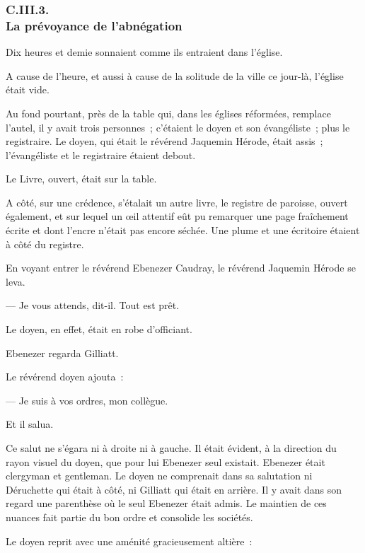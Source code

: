 \documentclass[french,twoside]{book} %
\begin{document}
 \subsubsection[{C.III.3. La prévoyance de l’abnégation}]{C.III.3. \\
La prévoyance de l’abnégation}
\noindent Dix heures et demie sonnaient comme ils entraient dans l’église.\par
A cause de l’heure, et aussi à cause de la solitude de la ville ce jour-là, l’église était vide.\par
Au fond pourtant, près de la table qui, dans les églises réformées, remplace l’autel, il y avait trois personnes ; c’étaient le doyen et son évangéliste ; plus le registraire. Le doyen, qui était le révérend Jaquemin Hérode, était assis ; l’évangéliste et le registraire étaient debout.\par
Le Livre, ouvert, était sur la table.\par
A côté, sur une crédence, s’étalait un autre livre, le registre de paroisse, ouvert également, et sur lequel un œil attentif eût pu remarquer une page fraîchement écrite et dont l’encre n’était pas encore séchée. Une plume et une écritoire étaient à côté du registre.\par
 En voyant entrer le révérend Ebenezer Caudray, le révérend Jaquemin Hérode se leva.\par
— Je vous attends, dit-il. Tout est prêt.\par
Le doyen, en effet, était en robe d’officiant.\par
Ebenezer regarda Gilliatt.\par
Le révérend doyen ajouta :\par
— Je suis à vos ordres, mon collègue.\par
Et il salua.\par
Ce salut ne s’égara ni à droite ni à gauche. Il était évident, à la direction du rayon visuel du doyen, que pour lui Ebenezer seul existait. Ebenezer était clergyman et gentleman. Le doyen ne comprenait dans sa salutation ni Déruchette qui était à côté, ni Gilliatt qui était en arrière. Il y avait dans son regard une parenthèse où le seul Ebenezer était admis. Le maintien de ces nuances fait partie du bon ordre et consolide les sociétés.\par
Le doyen reprit avec une aménité gracieusement altière :\par
\end{document}
